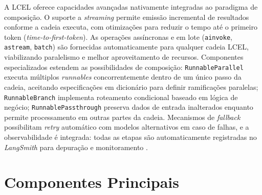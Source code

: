 \documentclass[12pt]{article}
\begin{document}

A LCEL oferece capacidades avançadas nativamente integradas ao paradigma de composição. O suporte a \textit{streaming} permite emissão incremental de resultados conforme a cadeia executa, com otimizações para reduzir o tempo até o primeiro token (\textit{time-to-first-token}). As operações assíncronas e em lote (\texttt{ainvoke}, \texttt{astream}, \texttt{batch}) são fornecidas automaticamente para qualquer cadeia LCEL, viabilizando paralelismo e melhor aproveitamento de recursos. Componentes especializados estendem as possibilidades de composição: \texttt{RunnableParallel} executa múltiplos \textit{runnables} concorrentemente dentro de um único passo da cadeia, aceitando especificações em dicionário para definir ramificações paralelas; \texttt{RunnableBranch} implementa roteamento condicional baseado em lógica de negócio; \texttt{RunnablePassthrough} preserva dados de entrada inalterados enquanto permite processamento em outras partes da cadeia. Mecanismos de \textit{fallback} possibilitam \textit{retry} automático com modelos alternativos em caso de falhas, e a observabilidade é integrada: todas as etapas são automaticamente registradas no \textit{LangSmith} para depuração e monitoramento \cite{langchain2023docs}.

\section{Componentes Principais}
\label{sec:componentes}


\end{document}
